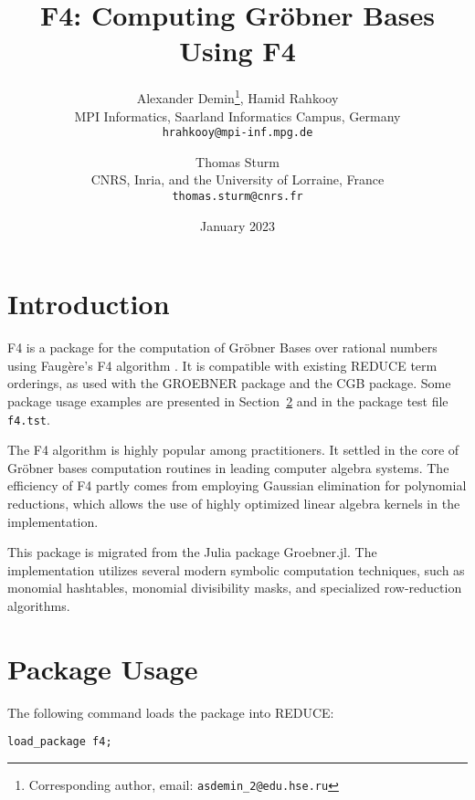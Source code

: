 \documentclass{article}
\newcommand{\grobner}{Gr\"obner}
\newcommand{\faugere}{Faug\`ere}
\newcommand{\code}[1]{\texttt{#1}}
\begin{document}
\title{F4: Computing Gröbner Bases Using F4}

\author{Alexander Demin\footnote{Corresponding author, email: \texttt{asdemin\_2@edu.hse.ru}}, Hamid Rahkooy\\
  MPI Informatics, Saarland Informatics Campus, Germany\\
  \texttt{hrahkooy@mpi-inf.mpg.de}
  \and
  Thomas Sturm\\
  CNRS, Inria, and the University of Lorraine, France\\
  \texttt{thomas.sturm@cnrs.fr}
}

\date{January 2023}

\maketitle

\section{Introduction}

F4 is a package for the computation of \grobner{} Bases over rational numbers
using \faugere{}'s F4 algorithm \cite{F4}. It is compatible with existing REDUCE term
orderings, as used with the GROEBNER package and the CGB package. Some package usage examples are
presented in Section~\ref{SE:usage} and in the package test file
\code{f4.tst}.

The F4 algorithm is highly popular among practitioners. It settled in the core of \grobner{} bases
computation routines in leading computer algebra systems. The efficiency of F4 partly comes from 
employing Gaussian elimination for polynomial reductions, 
which allows the use of highly optimized linear algebra kernels in the implementation.

This package is migrated from the Julia package Groebner.jl. 
The implementation utilizes several modern symbolic computation techniques, 
such as monomial hashtables, monomial divisibility masks, and specialized row-reduction algorithms.

\section{Package Usage}\label{SE:usage}

The following command loads the package into REDUCE:
%
\begin{center}
    \code{load\_package f4;}
\end{center}
\end{document}
